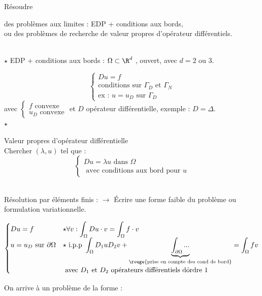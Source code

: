 \documentclass[12pt,a4paper]{article}
\begin{document}
	Résoudre \begin{minipage}[t]{20cm}
		des problèmes aux limites : EDP + conditions aux bords,\\
		ou des problèmes de recherche de valeur propres d'opérateur différentiels.
	\end{minipage}\\
	
	$\star$ EDP + conditions aux bords : $\Omega \subset \R^d$ , ouvert, avec $d = 2$ ou $3$.
	
	\[\begin{cases}
		Du = f\\
		\text{conditions sur } \Gamma_D \text{ et } \Gamma_N\\
		\text{ex : } u = u_D \text{ sur } \Gamma_D
	\end{cases}\] avec $\begin{cases}
		f \text{ convexe}\\
		u_D \text{ convexe}
	\end{cases}$ et $D$ opérateur différentielle, exemple : $D = \Delta$.\\
	
	$\star$\begin{minipage}[t]{20cm}
		Valeur propres d'opérateur différentielle\\
		Chercher $(\lambda,u)$ tel que : \[\begin{cases}
			Du = \lambda u \text{ dans } \Omega\\
			\text{ avec conditions aux bord pour } u
		\end{cases}\]
	\end{minipage}\\
	
	Résolution par éléments finis :
	$\longrightarrow$ Écrire une forme faible du problème ou formulation variationnelle.
	\begin{ex}
		$\begin{cases}
			Du = f & \star \forall v : \displaystyle\int_\Omega Du \cdot v = \int_\Omega f \cdot v\\
			u = u_D \text{ sur } \partial\Omega & \star \text{ i.p.p } \displaystyle\int_\Omega D_1 u D_2 v + \underbrace{\int_{\partial\Omega} ...}_{\rouge{\text{prise en compte des cond de bord}}} = \int_\Omega f v \\
			& \text{ avec } D_1 \text{ et } D_2 \text{ opérateurs différentiels d\'ordre 1}
		\end{cases}$
	\end{ex}
	
	On arrive à un problème de la forme :\\
	
\end{document}
